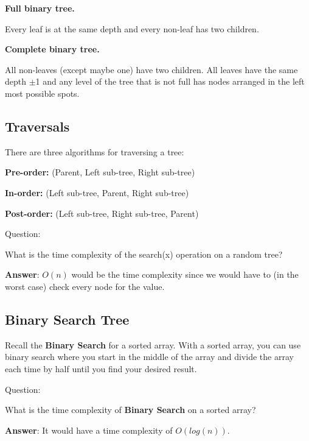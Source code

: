 \documentclass[11pt,a4paper,english]{article}
\begin{document}
\bigskip

\noindent\textbf{Full binary tree.}

Every leaf is at the same depth and every non-leaf has two children.

\bigskip
\noindent\textbf{Complete binary tree.}

All non-leaves (except maybe one) have two children. All leaves have the same depth $\pm$1 and any level of the tree that is not full has nodes arranged in the left most possible spots.

\subsection{Traversals}

There are three algorithms for traversing a tree:

\bigskip

\begin{itemize} {

    \item \textbf{Pre-order:} (Parent, Left sub-tree, Right sub-tree)
    \item \textbf{In-order:} (Left sub-tree, Parent, Right sub-tree)
    \item \textbf{Post-order:} (Left sub-tree, Right sub-tree, Parent)

}\end{itemize}

\bigskip

\begin{gbox}{Question:} {

  What is the time complexity of the search(x) operation on a random tree?

  \bigskip\textbf{Answer}: $O(n)$ would be the time complexity since we would have to (in the worst case) check every node for the value.


}\end{gbox}

\subsection{Binary Search Tree}

Recall the \textbf{Binary Search} for a sorted array. With a sorted array, you can use binary search where you start in the middle of the array and divide the array each time by half until you find your desired result.

\bigskip
\begin{gbox}{Question:} {

    What is the time complexity of \textbf{Binary Search} on a sorted array?

    \bigskip
    \textbf{Answer}: It would have a time complexity of $O(log(n))$.

}\end{gbox}
\end{document}
